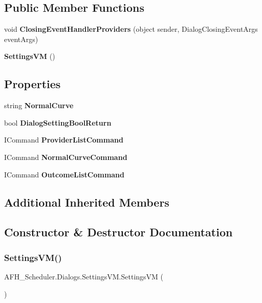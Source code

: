 \subsection*{Public Member Functions}
\begin{DoxyCompactItemize}
\item 
void \textbf{ Closing\+Event\+Handler\+Providers} (object sender, Dialog\+Closing\+Event\+Args event\+Args)
\item 
\textbf{ Settings\+VM} ()
\end{DoxyCompactItemize}
\subsection*{Properties}
\begin{DoxyCompactItemize}
\item 
string \textbf{ Normal\+Curve}\hspace{0.3cm}{\ttfamily  [get, set]}
\item 
bool \textbf{ Dialog\+Setting\+Bool\+Return}\hspace{0.3cm}{\ttfamily  [get, set]}
\item 
I\+Command \textbf{ Provider\+List\+Command}\hspace{0.3cm}{\ttfamily  [get]}
\item 
I\+Command \textbf{ Normal\+Curve\+Command}\hspace{0.3cm}{\ttfamily  [get]}
\item 
I\+Command \textbf{ Outcome\+List\+Command}\hspace{0.3cm}{\ttfamily  [get]}
\end{DoxyCompactItemize}
\subsection*{Additional Inherited Members}


\subsection{Constructor \& Destructor Documentation}
\mbox{\label{class_a_f_h___scheduler_1_1_dialogs_1_1_settings_v_m_aa9e7065188c99efae2bd11be734d1f6c}} 
\subsubsection{SettingsVM()}
{\footnotesize\ttfamily A\+F\+H\+\_\+\+Scheduler.\+Dialogs.\+Settings\+V\+M.\+Settings\+VM (\begin{DoxyParamCaption}{ }\end{DoxyParamCaption})}




